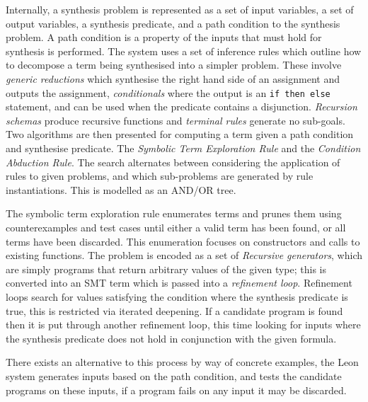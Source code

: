\documentclass[a4paper]{article}
\begin{document}
Internally, a synthesis problem is represented as a set of input variables, a set of output variables,
a synthesis predicate, and a path condition to the synthesis problem. A path condition is a property of the inputs that must 
hold for synthesis is performed. The system uses a 
set of inference rules which outline how to decompose a term being synthesised into a simpler problem. These involve 
\emph{generic reductions} which synthesise the right hand side of an assignment and outputs the assignment, \emph{conditionals} 
where the output is an \texttt{if then else} statement, and can be used when the predicate contains a disjunction. \emph{Recursion schemas}
produce recursive functions and \emph{terminal rules} generate no sub-goals. Two algorithms are then presented for computing a 
term given a path condition and synthesise predicate. The \emph{Symbolic Term Exploration Rule} and the \emph{Condition Abduction Rule}.
The search alternates between considering the application of rules to given problems, and which sub-problems are generated 
by rule instantiations. This is modelled as an AND/OR tree.

The symbolic term exploration rule enumerates terms and prunes them using counterexamples and test cases until 
either a valid term has been found, or all terms have been discarded. This enumeration focuses on constructors and calls to 
existing functions. The problem is encoded as a set of \emph{Recursive generators}, which are simply programs that return arbitrary
values of the given type; this is converted into an SMT term which is passed into a \emph{refinement loop}.
Refinement loops search for values satisfying the condition where the synthesis predicate is true, this is restricted via iterated deepening. If a candidate program is found then it 
is put through another refinement loop, this time looking for inputs where the synthesis predicate does not hold in conjunction with the given formula. 

There exists an alternative to this process by way of concrete examples, the Leon system generates inputs 
based on the path condition, and tests the candidate programs on these inputs, if a program fails on any input it may be
discarded. 
\end{document}
